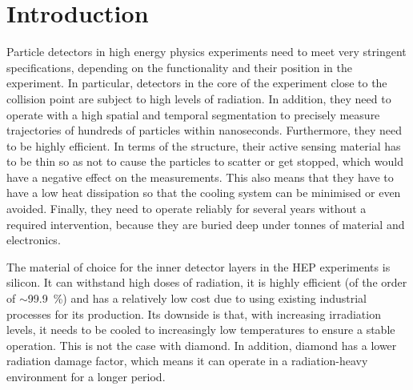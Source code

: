 
\section{Introduction}
Particle detectors in high energy physics experiments need to meet very stringent specifications, depending on the functionality and their position in the experiment. In particular, detectors in the core of the experiment close to the collision point are subject to high levels of radiation. In addition, they need to operate with a high spatial and temporal segmentation to precisely measure trajectories of hundreds of particles within nanoseconds. Furthermore, they need to be highly efficient. In terms of the structure, their active sensing material has to be thin so as not to cause the particles to scatter or get stopped, which would have a negative effect on the measurements. This also means that they have to have a low heat dissipation so that the cooling system can be minimised or even avoided. Finally, they need to operate reliably for several years without a required intervention, because they are buried deep under tonnes of material and electronics. 

The material of choice for the inner detector layers in the HEP experiments is silicon. It can withstand high doses of radiation, it is highly efficient (of the order of $\sim$99.9~\%) and has a relatively low cost due to using existing industrial processes for its production. Its downside is that, with increasing irradiation levels, it needs to be cooled to increasingly low temperatures to ensure a stable operation. This is not the case with diamond. In addition, diamond has a lower radiation damage factor, which means it can operate in a radiation-heavy environment for a longer period.

